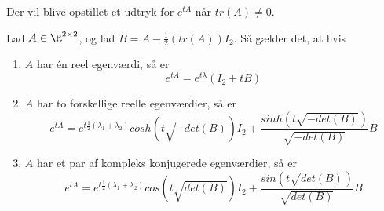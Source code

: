 Der vil blive opstillet et udtryk for $e^{tA}$ når $tr(A) \neq 0$. 

\begin{minipage}\textwidth
\begin{thmx} \textbf{} %
\newline
Lad $A\in \R^{2\times 2}$, og lad $B = A - \frac{1}{2}(tr(A))I_2$. Så gælder det, at hvis 
\begin{enumerate}
    \item $A$ har én reel egenværdi, så er $$e^{tA}=e^{t\lambda}(I_2+tB)$$
    \item $A$ har to forskellige reelle egenværdier, så er $$e^{tA}=e^{t\frac{1}{2}(\lambda_1+\lambda_2)}cosh\left(t\sqrt{-det(B)}\right)I_2+\frac{sinh\left(t\sqrt{-det(B)}\right)}{\sqrt{-det(B)}}B$$
    \item $A$ har et par af kompleks konjugerede egenværdier, så er $$e^{tA}=e^{t\frac{1}{2}(\lambda_1+\lambda_2)}cos\left(t\sqrt{det(B)}\right)I_2+\frac{sin\left(t\sqrt{det(B)}\right)}{\sqrt{det(B)}}B$$
\end{enumerate}  
\end{thmx}
\end{minipage}

